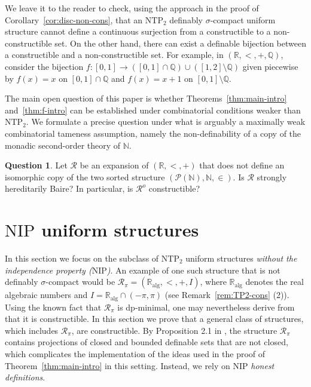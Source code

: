 \documentclass[12pt]{article}
\newcommand{\Rr}{\mathcal{R}}
\newcommand{\Ralg}{\mathbb{R}_{\text{alg}}}
\newcommand{\R}{\mathbb{R}}
\newcommand{\N}{\mathbb{N}}
\newcommand{\Q}{\mathbb{Q}}
\newcommand{\NIP}{\ensuremath{\mathrm{NIP}}}
\newcommand{\NTP}{\ensuremath{\mathrm{NTP}_2}}
\newcommand{\Ro}{\Rr^o}
\theoremstyle{definition}
\newtheorem{remark}[theorem]{Remark}
\newtheorem{question}[theorem]{Question}
\theoremstyle{remark}
\begin{document}
We leave it to the reader to check, using the approach in the proof of Corollary~\ref{cor:disc-non-cons}, that an $\NTP$ definably $\sigma$-compact uniform structure cannot define a continuous surjection from a constructible to a non-constructible set. On the other hand, there can exist a definable bijection between a constructible and a non-constructible set. For example, in $(\R,<,+,\Q)$, consider the bijection $f:[0,1]\rightarrow ([0,1] \cap \Q) \cup ([1,2]\setminus \Q)$ given piecewise by $f(x)=x$ on $[0,1]\cap \Q$ and $f(x)=x+1$ on $[0,1]\setminus \Q$. 


The main open question of this paper is whether Theorems~\ref{thm:main-intro} and~\ref{thm:f-intro} can be established under combinatorial conditions weaker than $\NTP$. We formulate a precise question under what is arguably a maximally weak combinatorial tameness assumption, namely the non-definability of a copy of the monadic second-order theory of $\N$. 

\begin{question}\label{Q:BP}
Let $\Rr$ be an expansion of $(\R,<,+)$ that does not define an isomorphic copy of the two sorted structure $(\mathcal{P}(\N), \N, \in)$. Is $\Rr$ strongly hereditarily Baire? In particular, is $\Ro$ constructible?
\end{question}

\section{$\NIP$ uniform structures} \label{sec:nip}

In this section we focus on the subclass of $\NTP$ uniform structures \emph{without the independence property ($\NIP$)}. An example of one such structure that is not definably $\sigma$-compact would be $\Rr_\pi=(\Ralg, <, +,I)$, where $\Ralg$ denotes the real algebraic numbers and $I=\Ralg \cap (-\pi, \pi)$ (see Remark~\ref{rem:TP2-cons} (2)). Using the known fact that $\Rr_\pi$ is dp-minimal, one may nevertheless derive from~\cite{sim-wals19} that it is constructible.
In this section we prove that a general class of structures, which includes $\Rr_\pi$, are constructible. By Proposition 2.1 in \cite{dolich-note}, the structure $\Rr_\pi$ contains projections of closed and bounded definable sets that are not closed, which complicates the implementation of the ideas used in the proof of Theorem~\ref{thm:main-intro} in this setting. Instead, we rely on $\NIP$ \emph{honest definitions}.
\end{document}
